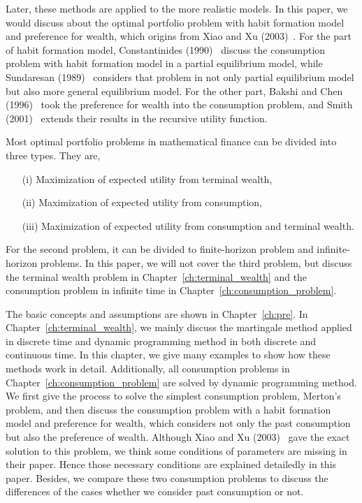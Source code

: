 \documentclass[a4paper]{article}
\theoremstyle{definition}
\numberwithin{equation}{section}
\begin{document}
Later, these methods are applied to the more realistic models. In this paper, we would discuss about the optimal portfolio problem with habit formation model and preference for wealth, which origins from Xiao and Xu (2003)~\cite{c-i with wealth}. For the part of habit formation model, Constantinides (1990)~\cite{constantinides} discuss the consumption problem with habit formation model in a partial equilibrium model, while Sundaresan (1989)~\cite{Sundaresan} considers that problem in not only partial equilibrium model but also more general equilibrium model. For the other part, Bakshi and Chen (1996)~\cite{bakshi and chen} took the preference for wealth into the consumption problem, and Smith (2001)~\cite{smith} extends their results in the recursive utility function.

Most optimal portfolio problems in mathematical finance can be divided into three types. They are,
\begin{itemize}
\item[(i)] Maximization of expected utility from terminal wealth,
\item[(ii)] Maximization of expected utility from consumption,
\item[(iii)] Maximization of expected utility from consumption and terminal wealth.
\end{itemize}
For the second problem, it can be divided to finite-horizon problem and infinite-horizon problems. In this paper, we will not cover the third problem, but discuss the terminal wealth problem in Chapter~\ref{ch:terminal_wealth} and the consumption problem in infinite time in Chapter~\ref{ch:consumption_problem}.

The basic concepts and assumptions are shown in Chapter~\ref{ch:pre}. In Chapter~\ref{ch:terminal_wealth}, we mainly discuss the martingale method applied in discrete time and dynamic programming method in both discrete and continuous time. In this chapter, we give many examples to show how these methods work in detail. Additionally, all consumption problems in Chapter~\ref{ch:consumption_problem} are solved by dynamic programming method. We first give the process to solve the simplest consumption problem, Merton's problem, and then discuss the consumption problem with a habit formation model and preference for wealth, which considers not only the past consumption but also the preference of wealth. Although Xiao and Xu (2003)~\cite{c-i with wealth} gave the exact solution to this problem, we think some conditions of parameters are missing in their paper. Hence those necessary conditions are explained detailedly in this paper. Besides, we compare these two consumption problems to discuss the differences of the cases whether we consider past consumption or not.
\end{document}
